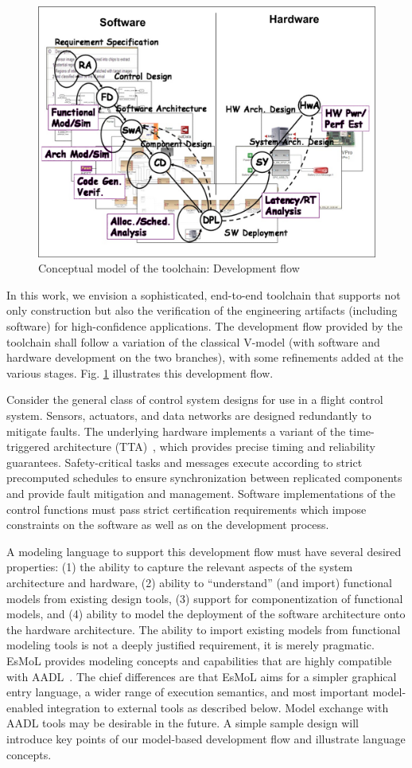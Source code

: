 
\begin{figure}
	\centering
   \includegraphics[width=0.65\columnwidth]{diagrams/vdiagram.png}
   \caption{Conceptual model of the toolchain: Development flow}
   \label{fig:vdiagram}
\end{figure}

In this work, we envision a sophisticated, end-to-end toolchain that supports not only construction but also the verification of the engineering artifacts (including software) for high-confidence applications. The development flow provided by the toolchain shall follow a variation of the classical V-model (with software and hardware development on the two branches), with some refinements added at the various stages. Fig. \ref{fig:vdiagram} illustrates this development flow.

Consider the general class of control system designs for use in a flight control system.  Sensors, actuators, and data networks are designed redundantly to mitigate faults.  The underlying hardware implements a variant of the time-triggered architecture (TTA)~\cite{kopetz:2001-22a}, which provides precise timing and reliability guarantees.  Safety-critical tasks and messages execute according to strict precomputed schedules to ensure synchronization between replicated components and provide fault mitigation and management.  Software implementations of the control functions must pass strict certification requirements which impose constraints on the software as well as on the development process.  

A modeling language to support this development flow must have several desired properties:  (1) the ability to capture the relevant aspects of the system architecture and hardware, (2) ability to ``understand'' (and import) functional models from existing design tools, (3) support for componentization of functional models, and (4) ability to model the deployment of the software architecture onto the hardware architecture. The ability to import existing models from functional modeling tools is not a deeply justified requirement, it is merely pragmatic.  EsMoL provides modeling concepts and capabilities that are highly compatible with AADL~\cite{AADL}.  The chief differences are that EsMoL aims for a simpler graphical entry language, a wider range of execution semantics, and most important model-enabled integration to external tools as described below.  Model exchange with AADL tools may be desirable in the future.  A simple sample design will introduce key points of our model-based development flow and illustrate language concepts.  

